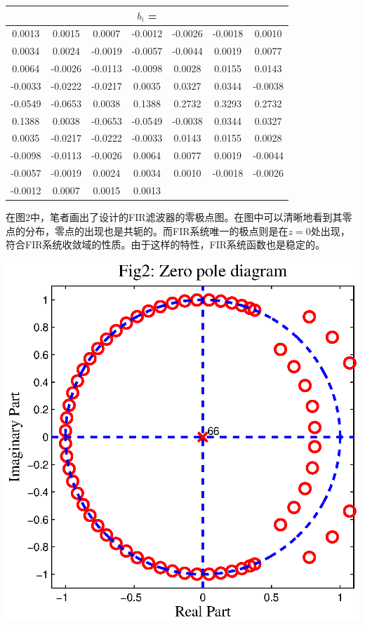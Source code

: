\documentclass[a4paper,11pt,onecolumn,twoside]{article}
\begin{document}
\begin{center}
\begin{tabular}{|c|c|c|c|c|c|c|}
\hline \multicolumn{7}{|c|}{$b_i$ = }\\
\hline 0.0013 & 0.0015 & 0.0007 & -0.0012 & -0.0026 & -0.0018 & 0.0010\\
\hline 0.0034 & 0.0024 & -0.0019 & -0.0057 & -0.0044 & 0.0019 & 0.0077\\
\hline 0.0064 & -0.0026 & -0.0113 & -0.0098 & 0.0028 & 0.0155 & 0.0143\\
\hline -0.0033 & -0.0222 & -0.0217 & 0.0035 & 0.0327 & 0.0344 & -0.0038\\
\hline -0.0549 & -0.0653 & 0.0038 & 0.1388 & 0.2732 & 0.3293 & 0.2732\\
\hline 0.1388 & 0.0038 & -0.0653 & -0.0549 & -0.0038 & 0.0344 & 0.0327\\
\hline 0.0035 & -0.0217 & -0.0222 & -0.0033 & 0.0143 & 0.0155 & 0.0028\\
\hline -0.0098 & -0.0113 & -0.0026 & 0.0064 & 0.0077 & 0.0019 & -0.0044\\
\hline -0.0057 & -0.0019 & 0.0024 & 0.0034 & 0.0010 & -0.0018 & -0.0026\\
\hline -0.0012 & 0.0007 & 0.0015 & 0.0013\\
\hline
\end{tabular}
\end{center}

在图2中，笔者画出了设计的FIR滤波器的零极点图。在图中可以清晰地看到其零点的分布，零点的出现也是共轭的。而FIR系统唯一的极点则是在$z=0$处出现，符合FIR系统收敛域的性质。由于这样的特性，FIR系统函数也是稳定的。
\begin{center}
    \includegraphics[width=1\textwidth]{fig2.eps}
\end{center}
\end{document}
